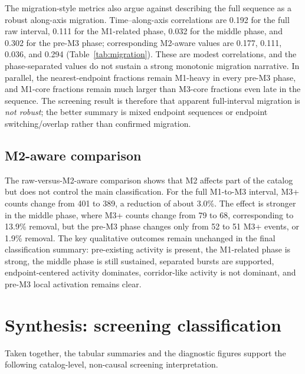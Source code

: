 \documentclass[11pt]{article}
\begin{document}
The migration-style metrics also argue against describing the full sequence as a robust along-axis migration. Time--along-axis correlations are 0.192 for the full raw interval, 0.111 for the M1-related phase, 0.032 for the middle phase, and 0.302 for the pre-M3 phase; corresponding M2-aware values are 0.177, 0.111, 0.036, and 0.294 (Table~\ref{tab:migration}). These are modest correlations, and the phase-separated values do not sustain a strong monotonic migration narrative. In parallel, the nearest-endpoint fractions remain M1-heavy in every pre-M3 phase, and M1-core fractions remain much larger than M3-core fractions even late in the sequence. The screening result is therefore that apparent full-interval migration is \emph{not robust}; the better summary is mixed endpoint sequences or endpoint switching/overlap rather than confirmed migration.

\subsection{M2-aware comparison}
The raw-versus-M2-aware comparison shows that M2 affects part of the catalog but does not control the main classification. For the full M1-to-M3 interval, M3+ counts change from 401 to 389, a reduction of about 3.0\%. The effect is stronger in the middle phase, where M3+ counts change from 79 to 68, corresponding to 13.9\% removal, but the pre-M3 phase changes only from 52 to 51 M3+ events, or 1.9\% removal. The key qualitative outcomes remain unchanged in the final classification summary: pre-existing activity is present, the M1-related phase is strong, the middle phase is still sustained, separated bursts are supported, endpoint-centered activity dominates, corridor-like activity is not dominant, and pre-M3 local activation remains clear.

\section{Synthesis: screening classification}
Taken together, the tabular summaries and the diagnostic figures support the following catalog-level, non-causal screening interpretation.
\end{document}
